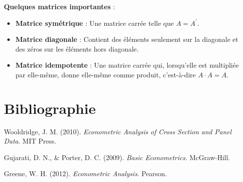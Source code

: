 \documentclass[14pt]{extarticle} %
\begin{document}
\textbf{Quelques matrices importantes} :
\begin{itemize}
    \item \textbf{Matrice symétrique} : Une matrice carrée telle que \(A = A^{\prime}\).
    \item \textbf{Matrice diagonale} : Contient des éléments seulement sur la diagonale et 
    des zéros sur les éléments hors diagonale.
    \item \textbf{Matrice idempotente} : Une matrice carrée qui, lorsqu’elle est multipliée 
    par elle-même, donne elle-même comme produit, c’est-à-dire \(A \cdot A = A\).
\end{itemize}

\section*{Bibliographie}

\begin{thebibliography}{9}

Wooldridge, J. M. (2010). \textit{Econometric Analysis of Cross Section and Panel Data}. MIT Press.

Gujarati, D. N., \& Porter, D. C. (2009). \textit{Basic Econometrics}. McGraw-Hill.

Greene, W. H. (2012). \textit{Econometric Analysis}. Pearson.

\end{thebibliography}
\end{document}
